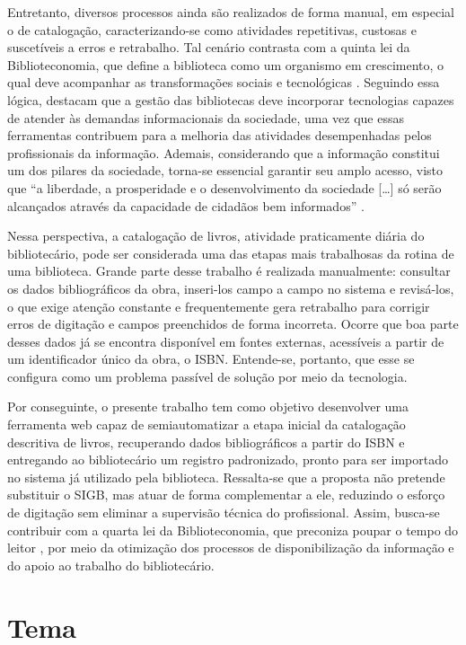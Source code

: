 Entretanto, diversos processos ainda são realizados de forma manual, em especial o de catalogação, caracterizando-se como atividades repetitivas, custosas e suscetíveis a erros e retrabalho. Tal cenário contrasta com a quinta lei da Biblioteconomia, que define a biblioteca como um organismo em crescimento, o qual deve acompanhar as transformações sociais e tecnológicas \cite{ranganathan1931}. Seguindo essa lógica,  destacam que a gestão das bibliotecas deve incorporar tecnologias capazes de atender às demandas informacionais da sociedade, uma vez que essas ferramentas contribuem para a melhoria das atividades desempenhadas pelos profissionais da informação. Ademais, considerando que a informação constitui um dos pilares da sociedade, torna-se essencial garantir seu amplo acesso, visto que ``a liberdade, a prosperidade e o desenvolvimento da sociedade [\ldots] só serão alcançados através da capacidade de cidadãos bem informados'' \cite{ifla1994}.

Nessa perspectiva, a catalogação de livros, atividade praticamente diária do bibliotecário, pode ser considerada uma das etapas mais trabalhosas da rotina de uma biblioteca. Grande parte desse trabalho é realizada manualmente: consultar os dados bibliográficos da obra, inseri-los campo a campo no sistema e revisá-los, o que exige atenção constante e frequentemente gera retrabalho para corrigir erros de digitação e campos preenchidos de forma incorreta. Ocorre que boa parte desses dados já se encontra disponível em fontes externas, acessíveis a partir de um identificador único da obra, o ISBN. Entende-se, portanto, que esse se configura como um problema passível de solução por meio da tecnologia.

Por conseguinte, o presente trabalho tem como objetivo desenvolver uma ferramenta web capaz de semiautomatizar a etapa inicial da catalogação descritiva de livros, recuperando dados bibliográficos a partir do ISBN e entregando ao bibliotecário um registro padronizado, pronto para ser importado no sistema já utilizado pela biblioteca. Ressalta-se que a proposta não pretende substituir o SIGB, mas atuar de forma complementar a ele, reduzindo o esforço de digitação sem eliminar a supervisão técnica do profissional. Assim, busca-se contribuir com a quarta lei da Biblioteconomia, que preconiza poupar o tempo do leitor \cite{ranganathan1931}, por meio da otimização dos processos de disponibilização da informação e do apoio ao trabalho do bibliotecário.

\section{Tema}
\label{sec:tema}

